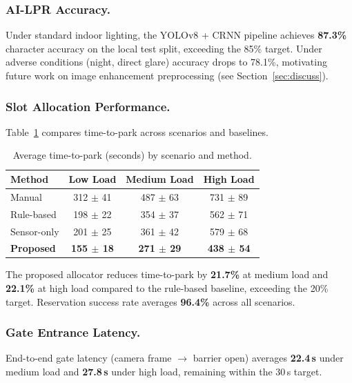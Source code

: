 \documentclass[runningheads]{llncs}
\begin{document}
\subsubsection{AI-LPR Accuracy.}

Under standard indoor lighting, the YOLOv8 + CRNN pipeline
achieves \textbf{87.3\%} character accuracy on the local test
split, exceeding the 85\% target. Under adverse conditions
(night, direct glare) accuracy drops to 78.1\%, motivating
future work on image enhancement preprocessing (see
Section~\ref{sec:discuss}).

\subsubsection{Slot Allocation Performance.}

Table~\ref{tab:alloc} compares time-to-park across scenarios
and baselines.

\begin{table}[ht]
\caption{Average time-to-park (seconds) by scenario and
method.}\label{tab:alloc}
\begin{tabular}{lccc}
\toprule
\textbf{Method} &
\textbf{Low Load} &
\textbf{Medium Load} &
\textbf{High Load} \\
\midrule
Manual            & 312 $\pm$ 41 & 487 $\pm$ 63 & 731 $\pm$ 89 \\
Rule-based        & 198 $\pm$ 22 & 354 $\pm$ 37 & 562 $\pm$ 71 \\
Sensor-only       & 201 $\pm$ 25 & 361 $\pm$ 42 & 579 $\pm$ 68 \\
\textbf{Proposed} & \textbf{155 $\pm$ 18} & \textbf{271 $\pm$ 29} & \textbf{438 $\pm$ 54} \\
\bottomrule
\end{tabular}
\end{table}

The proposed allocator reduces time-to-park by
\textbf{21.7\%} at medium load and \textbf{22.1\%} at high
load compared to the rule-based baseline, exceeding the 20\%
target. Reservation success rate averages \textbf{96.4\%}
across all scenarios.

\subsubsection{Gate Entrance Latency.}

End-to-end gate latency (camera frame $\rightarrow$ barrier
open) averages \textbf{22.4\,s} under medium load and
\textbf{27.8\,s} under high load, remaining within the
30\,s target.
\end{document}
